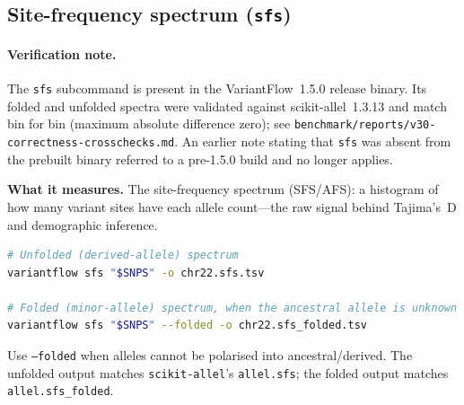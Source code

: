 \documentclass[11pt]{article}
\begin{document}
\subsection{Site-frequency spectrum (\texttt{sfs})}
\paragraph{Verification note.} The \texttt{sfs} subcommand is present in the
VariantFlow~1.5.0 release binary. Its folded and unfolded spectra were validated
against scikit-allel~1.3.13 and match bin for bin (maximum absolute difference
zero); see \texttt{benchmark/reports/v30-correctness-crosschecks.md}. An earlier
note stating that \texttt{sfs} was absent from the prebuilt binary referred to a
pre-1.5.0 build and no longer applies.

\textbf{What it measures.} The site-frequency spectrum (SFS/AFS): a histogram of
how many variant sites have each allele count---the raw signal behind Tajima's~D
and demographic inference.
\begin{lstlisting}[language=bash]
# Unfolded (derived-allele) spectrum
variantflow sfs "$SNPS" -o chr22.sfs.tsv

# Folded (minor-allele) spectrum, when the ancestral allele is unknown
variantflow sfs "$SNPS" --folded -o chr22.sfs_folded.tsv
\end{lstlisting}
Use \texttt{--folded} when alleles cannot be polarised into ancestral/derived. The
unfolded output matches \texttt{scikit-allel}'s \texttt{allel.sfs}; the folded
output matches \texttt{allel.sfs\_folded}.
\end{document}
